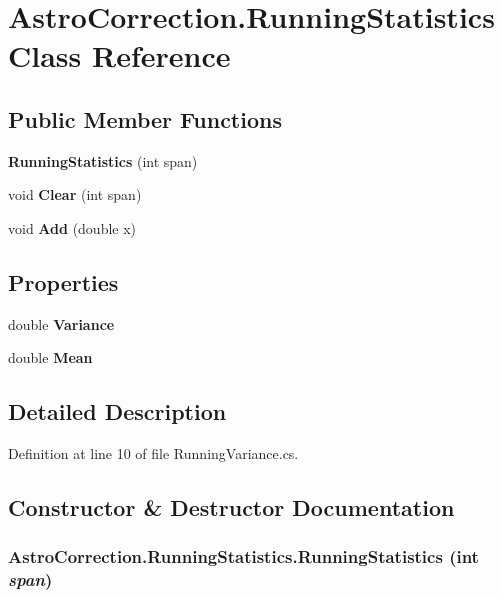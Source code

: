 \section{AstroCorrection.RunningStatistics Class Reference}
\label{class_astro_correction_1_1_running_statistics}
\subsection*{Public Member Functions}
\begin{DoxyCompactItemize}
\item 
{\bf RunningStatistics} (int span)
\item 
void {\bf Clear} (int span)
\item 
void {\bf Add} (double x)
\end{DoxyCompactItemize}
\subsection*{Properties}
\begin{DoxyCompactItemize}
\item 
double {\bf Variance}\hspace{0.3cm}{\ttfamily  [get]}
\item 
double {\bf Mean}\hspace{0.3cm}{\ttfamily  [get]}
\end{DoxyCompactItemize}


\subsection{Detailed Description}


Definition at line 10 of file RunningVariance.cs.

\subsection{Constructor \& Destructor Documentation}
\subsubsection[{RunningStatistics}]{\setlength{\rightskip}{0pt plus 5cm}AstroCorrection.RunningStatistics.RunningStatistics (int {\em span})}\label{class_astro_correction_1_1_running_statistics_a18877e6c262ce9f46f9c5fd4060399d2}


